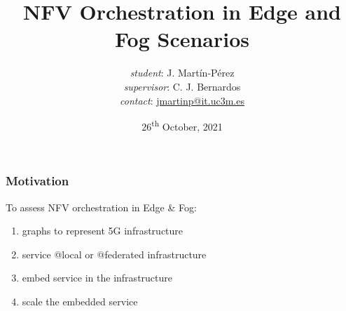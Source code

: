 \documentclass[aspectratio=169]{beamer}
\title{NFV Orchestration in Edge and Fog Scenarios}
\date{26\textsuperscript{th} October, 2021}
\author{
    {\footnotesize \textit{student}}: \! \! \! J. Martín-Pérez\\
    {\footnotesize \textit{supervisor}}: C. J. Bernardos\\
    \vspace{2em}
    \footnotesize{\textit{contact}: \href{mailto:jmartinp@it.uc3m.es}{jmartinp@it.uc3m.es}}
}
\begin{document}
\begin{frame}[plain]
\titlepage
\end{frame}

\setcounter{framenumber}{0}





\begin{frame}
    \frametitle{Motivation}

    To assess NFV orchestration in Edge \& Fog:\pause
    \begin{enumerate}
        \item graphs to represent 5G infrastructure \pause
        \item service @local or @federated infrastructure \pause
        \item embed service in the infrastructure \pause
        \item scale the embedded service \pause
    \end{enumerate}
\end{frame}
\end{document}

